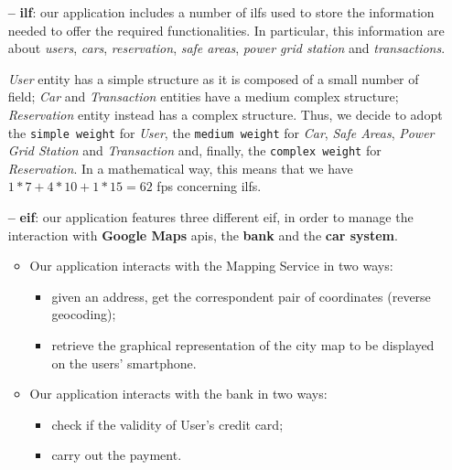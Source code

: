 \begin{itemize}

\item[\textbf{--}] \textbf{\acl{ilf}}: our application includes a number of \acs{ilf}s used to store the information needed to offer the required functionalities. In particular, this information are about \textit{users}, \textit{cars}, \textit{reservation}, \textit{safe areas}, \textit{power grid station} and \textit{transactions}. 

\textit{User} entity has a simple structure as it is composed of a small number of field; \textit{Car} and \textit{Transaction} entities have a medium complex structure; \textit{Reservation} entity instead has a complex structure. Thus, we decide to adopt the \texttt{simple weight} for \textit{User}, the \texttt{medium weight} for \textit{Car}, \textit{Safe Areas}, \textit{Power Grid Station} and \textit{Transaction} and, finally, the \texttt{complex weight} for \textit{Reservation}.
In a mathematical way, this means that we have $1 * 7 + 4 * 10 + 1 * 15 = 62$ \acs{fp}s concerning \acs{ilf}s.

\item[\textbf{--}] \textbf{\acl{eif}}: our application features three different \acs{eif}, in order to manage the interaction with \textbf{Google Maps} \acs{api}s, the \textbf{bank} and the \textbf{car system}.
 
\begin{itemize}
\item Our application interacts with the Mapping Service in two ways:
	\begin{itemize}
	
	\item given an address, get the correspondent pair of coordinates (reverse geocoding);

	\item retrieve the graphical representation of the city map to be displayed on the users' smartphone.

    \end{itemize}
    
\item Our application interacts with the bank in two ways:

	\begin{itemize}
	
	\item check if the validity of User's credit card;
	
	\item carry out the payment.


\end{itemize}
\end{itemize}
\end{itemize}
